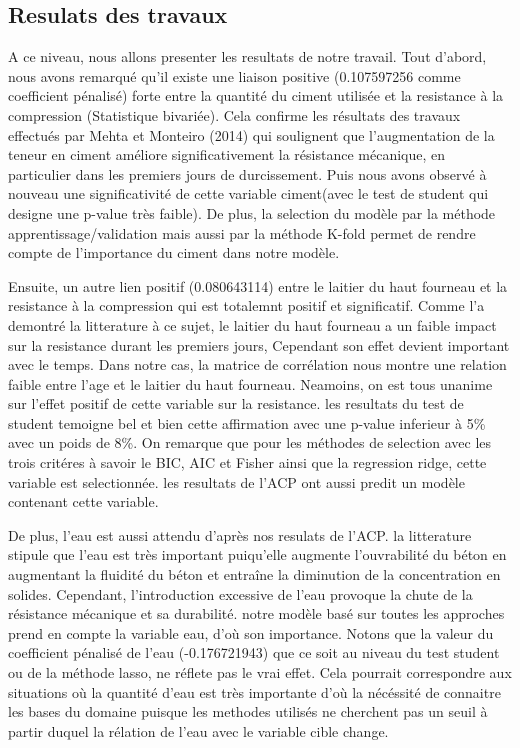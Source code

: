 \documentclass[
  12pt,
]{article}
\begin{document}
\subsection{Resulats des travaux}\label{resulats-des-travaux}

A ce niveau, nous allons presenter les resultats de notre travail. Tout
d'abord, nous avons remarqué qu'il existe une liaison positive
(0.107597256 comme coefficient pénalisé) forte entre la quantité du
ciment utilisée et la resistance à la compression (Statistique
bivariée). Cela confirme les résultats des travaux effectués par Mehta
et Monteiro (2014) qui soulignent que l'augmentation de la teneur en
ciment améliore significativement la résistance mécanique, en
particulier dans les premiers jours de durcissement. Puis nous avons
observé à nouveau une significativité de cette variable ciment(avec le
test de student qui designe une p-value très faible). De plus, la
selection du modèle par la méthode apprentissage/validation mais aussi
par la méthode K-fold permet de rendre compte de l'importance du ciment
dans notre modèle.

Ensuite, un autre lien positif (0.080643114) entre le laitier du haut
fourneau et la resistance à la compression qui est totalemnt positif et
significatif. Comme l'a demontré la litterature à ce sujet, le laitier
du haut fourneau a un faible impact sur la resistance durant les
premiers jours, Cependant son effet devient important avec le temps.
Dans notre cas, la matrice de corrélation nous montre une relation
faible entre l'age et le laitier du haut fourneau. Neamoins, on est tous
unanime sur l'effet positif de cette variable sur la resistance. les
resultats du test de student temoigne bel et bien cette affirmation avec
une p-value inferieur à 5\% avec un poids de 8\%. On remarque que pour
les méthodes de selection avec les trois critéres à savoir le BIC, AIC
et Fisher ainsi que la regression ridge, cette variable est
selectionnée. les resultats de l'ACP ont aussi predit un modèle
contenant cette variable.

De plus, l'eau est aussi attendu d'après nos resulats de l'ACP. la
litterature stipule que l'eau est très important puiqu'elle augmente
l'ouvrabilité du béton en augmentant la fluidité du béton et entraîne la
diminution de la concentration en solides. Cependant, l'introduction
excessive de l'eau provoque la chute de la résistance mécanique et sa
durabilité. notre modèle basé sur toutes les approches prend en compte
la variable eau, d'où son importance. Notons que la valeur du
coefficient pénalisé de l'eau (-0.176721943) que ce soit au niveau du
test student ou de la méthode lasso, ne réflete pas le vrai effet. Cela
pourrait correspondre aux situations où la quantité d'eau est très
importante d'où la nécéssité de connaitre les bases du domaine puisque
les methodes utilisés ne cherchent pas un seuil à partir duquel la
rélation de l'eau avec le variable cible change.
\end{document}
